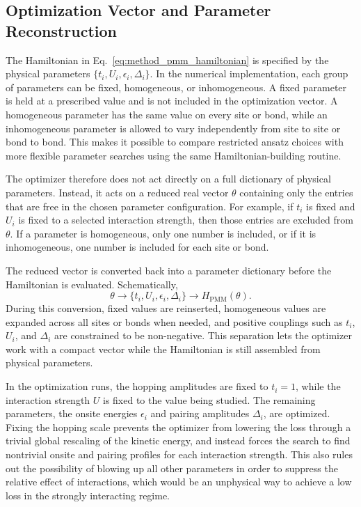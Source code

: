 \subsection{Optimization Vector and Parameter Reconstruction}
\label{sec:method-optimization-vector}
The Hamiltonian in Eq.~\ref{eq:method_pmm_hamiltonian} is specified by the physical parameters $\{t_i,U_i,\epsilon_i,\Delta_i\}$. In the numerical implementation, each group of parameters can be fixed, homogeneous, or inhomogeneous. A fixed parameter is held at a prescribed value and is not included in the optimization vector. A homogeneous parameter has the same value on every site or bond, while an inhomogeneous parameter is allowed to vary independently from site to site or bond to bond. This makes it possible to compare restricted ansatz choices with more flexible parameter searches using the same Hamiltonian-building routine.

The optimizer therefore does not act directly on a full dictionary of physical parameters. Instead, it acts on a reduced real vector $\theta$ containing only the entries that are free in the chosen parameter configuration. For example, if $t_i$ is fixed and $U_i$ is fixed to a selected interaction strength, then those entries are excluded from $\theta$. If a parameter is homogeneous, only one number is included, or if it is inhomogeneous, one number is included for each site or bond.

The reduced vector is converted back into a parameter dictionary before the Hamiltonian is evaluated. Schematically,
\begin{equation}
\theta
\longrightarrow
\{t_i,U_i,\epsilon_i,\Delta_i\}
\longrightarrow
H_{\mathrm{PMM}}(\theta).
\end{equation}
During this conversion, fixed values are reinserted, homogeneous values are expanded across all sites or bonds when needed, and positive couplings such as $t_i$, $U_i$, and $\Delta_i$ are constrained to be non-negative. This separation lets the optimizer work with a compact vector while the Hamiltonian is still assembled from physical parameters.

In the optimization runs, the hopping amplitudes are fixed to $t_i=1$, while the interaction strength $U$ is fixed to the value being studied. The remaining parameters, the onsite energies $\epsilon_i$ and pairing amplitudes $\Delta_i$, are optimized. Fixing the hopping scale prevents the optimizer from lowering the loss through a trivial global rescaling of the kinetic energy, and instead forces the search to find nontrivial onsite and pairing profiles for each interaction strength. This also rules out the possibility of blowing up all other parameters in order to suppress the relative effect of interactions, which would be an unphysical way to achieve a low loss in the strongly interacting regime.

